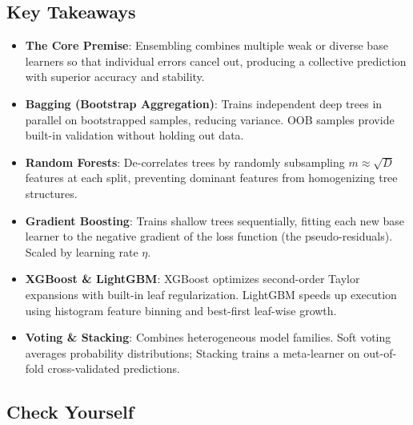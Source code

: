 \subsection{Key Takeaways}\label{subsec:ensembles_takeaways}

\begin{takeaways}
\begin{itemize}
    \item \textbf{The Core Premise}: Ensembling combines multiple weak or diverse base learners so that individual errors cancel out, producing a collective prediction with superior accuracy and stability.
    \item \textbf{Bagging (Bootstrap Aggregation)}: Trains independent deep trees in parallel on bootstrapped samples, reducing variance. OOB samples provide built-in validation without holding out data.
    \item \textbf{Random Forests}: De-correlates trees by randomly subsampling $m \approx \sqrt{D}$ features at each split, preventing dominant features from homogenizing tree structures.
    \item \textbf{Gradient Boosting}: Trains shallow trees sequentially, fitting each new base learner to the negative gradient of the loss function (the pseudo-residuals). Scaled by learning rate $\eta$.
    \item \textbf{XGBoost \& LightGBM}: XGBoost optimizes second-order Taylor expansions with built-in leaf regularization. LightGBM speeds up execution using histogram feature binning and best-first leaf-wise growth.
    \item \textbf{Voting \& Stacking}: Combines heterogeneous model families. Soft voting averages probability distributions; Stacking trains a meta-learner on out-of-fold cross-validated predictions.
\end{itemize}
\end{takeaways}

\subsection{Check Yourself}\label{subsec:ensembles_check_yourself}

